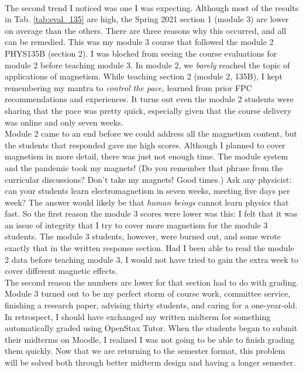 \documentclass[../../main.tex]{subfiles}
\begin{document}
\\
\vspace{0.25cm}
The second trend I noticed was one I was expecting.  Although most of the results in Tab. \ref{tab:eval_135} are high, the Spring 2021 section 1 (module 3) are lower on average than the others.  There are three reasons why this occurred, and all can be remedied.  This was my module 3 course that followed the module 2 PHYS135B (section 2).  I was blocked from seeing the course evaluations for module 2 before teaching module 3.  In module 2, we \textit{barely} reached the topic of applications of magnetism.  While teaching section 2 (module 2, 135B), I kept remembering my mantra to \textit{control the pace,} learned from prior FPC recommendations and experiences.  It turns out even the module 2 students were sharing that the pace was pretty quick, especially given that the course delivery was online and only seven weeks.
\\
\vspace{0.25cm}
Module 2 came to an end before we could address all the magnetism content, but the students that responded gave me high scores.  Although I planned to cover magnetism in more detail, there was just not enough time.  The module system and the pandemic took my magnets!  (Do you remember that phrase from the curricular discussions?  Don't take my magnets!  Good times.)  Ask any physicist: can your students learn electromagnetism in seven weeks, meeting five days per week?  The answer would likely be that \textit{human beings} cannot learn physics that fast.  So the first reason the module 3 scores were lower was this: I felt that it was an issue of integrity that I try to cover more magnetism for the module 3 students.  The module 3 students, however, were burned out, and some wrote exactly that in the written response section.  Had I been able to read the module 2 data before teaching module 3, I would not have tried to gain the extra week to cover different magnetic effects.
\\
\vspace{0.25cm}
The second reason the numbers are lower for that section had to do with grading.  Module 3 turned out to be my perfect storm of course work, committee service, finishing a research paper, advising thirty students, and caring for a one-year-old.  In retrospect, I should have exchanged my written midterm for something automatically graded using OpenStax Tutor.  When the students began to submit their midterms on Moodle, I realized I was not going to be able to finish grading them quickly.  Now that we are returning to the semester format, this problem will be solved both through better midterm design and having a longer semester.
\end{document}
